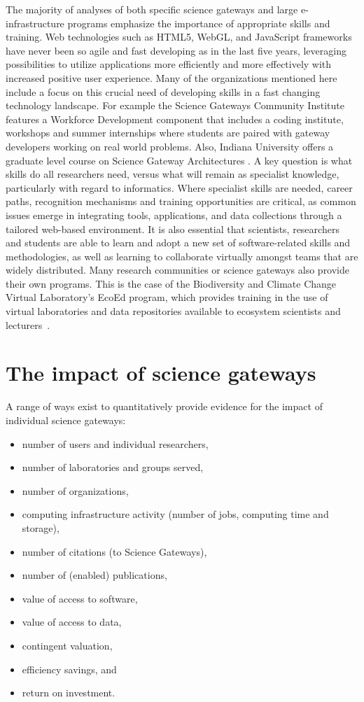 \documentclass[review]{elsarticle}
\begin{document}
The majority of analyses of both specific science gateways and large e-infrastructure programs emphasize the importance of appropriate skills and training. Web technologies such as HTML5, WebGL, and JavaScript frameworks have never been so agile and fast developing as in the last five years, leveraging possibilities to utilize applications more efficiently and more effectively with increased positive user experience. 
Many of the organizations mentioned here include a focus on this crucial need of developing skills in a fast changing technology landscape. 
For example the Science Gateways Community Institute features a Workforce Development component that includes a coding institute, workshops and summer internships where students are paired with gateway developers working on real world problems. Also, Indiana University offers a graduate level course on Science Gateway Architectures \cite{course-86}. 
A key question is what skills do all researchers need, versus what will remain as specialist knowledge, particularly with regard to informatics. Where specialist skills are needed, career paths, recognition mechanisms and training opportunities are critical, as common issues emerge in integrating tools, applications, and data collections through a tailored web-based environment. 
It is also essential that scientists, researchers and students are able to learn and adopt a new set of software-related skills and methodologies, as well as learning to collaborate virtually amongst teams that are widely distributed. 
Many research communities or science gateways also provide their own programs. This is the case of the Biodiversity and Climate Change Virtual Laboratory's EcoEd program, which provides training in the use of virtual laboratories and data repositories available to ecosystem scientists and lecturers~\cite{ecoed-81}. 


\section{The impact of science gateways}

A range of ways exist to quantitatively provide evidence for the impact of individual science gateways:
\begin{itemize}
	\item number of users and individual researchers,
	\item number of laboratories and groups served,
	\item number of organizations,
	\item computing infrastructure activity (number of jobs, computing time and storage),
	\item number of  citations (to Science Gateways),
	\item number of  (enabled) publications,
	\item value of access to software,
	\item value of access to data,
	\item contingent valuation,
	\item efficiency savings, and
	\item return on investment.
\end{itemize}
\end{document}
